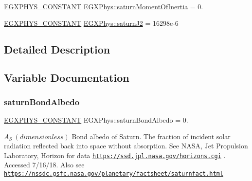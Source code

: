 \begin{DoxyCompactItemize}
\item 
\mbox{\hyperlink{group___e_g_x_phys-_constants-_macros_ga76980d288494ce1714c9ac68a95ba702}{E\+G\+X\+P\+H\+Y\+S\+\_\+\+C\+O\+N\+S\+T\+A\+NT}} \mbox{\hyperlink{group___e_g_x_phys-_constants-_astrophysics-_solar_system-_saturn-_bulk_gaf0076aaa3db73a1ec1752aec50bcc42d}{E\+G\+X\+Phys\+::saturn\+Moment\+Of\+Inertia}} = 0.
\item 
\mbox{\hyperlink{group___e_g_x_phys-_constants-_macros_ga76980d288494ce1714c9ac68a95ba702}{E\+G\+X\+P\+H\+Y\+S\+\_\+\+C\+O\+N\+S\+T\+A\+NT}} \mbox{\hyperlink{group___e_g_x_phys-_constants-_astrophysics-_solar_system-_saturn-_bulk_ga8646bad89fe940c47520cd30c8c89b0b}{E\+G\+X\+Phys\+::saturn\+J2}} = 16298e-\/6
\end{DoxyCompactItemize}


\subsection{Detailed Description}


\subsection{Variable Documentation}
\mbox{\label{group___e_g_x_phys-_constants-_astrophysics-_solar_system-_saturn-_bulk_ga15adee1fd2e0b08862bd3e216101454a}} 
\subsubsection{\texorpdfstring{saturn\+Bond\+Albedo}{saturnBondAlbedo}}
{\footnotesize\ttfamily \mbox{\hyperlink{group___e_g_x_phys-_constants-_macros_ga76980d288494ce1714c9ac68a95ba702}{E\+G\+X\+P\+H\+Y\+S\+\_\+\+C\+O\+N\+S\+T\+A\+NT}} E\+G\+X\+Phys\+::saturn\+Bond\+Albedo = 0.}

$ A_{S} \ (dimensionless)$ Bond albedo of Saturn. The fraction of incident solar radiation reflected back into space without absorption. See N\+A\+SA, Jet Propulsion Laboratory, Horizon for data \href{https://ssd.jpl.nasa.gov/horizons.cgi}{\tt https\+://ssd.\+jpl.\+nasa.\+gov/horizons.\+cgi} . Accessed 7/16/18. Also see \href{https://nssdc.gsfc.nasa.gov/planetary/factsheet/saturnfact.html}{\tt https\+://nssdc.\+gsfc.\+nasa.\+gov/planetary/factsheet/saturnfact.\+html} \mbox{\label{group___e_g_x_phys-_constants-_astrophysics-_solar_system-_saturn-_bulk_gacf0ffaf60d1b37b373cc4addf1c7b737}} 
